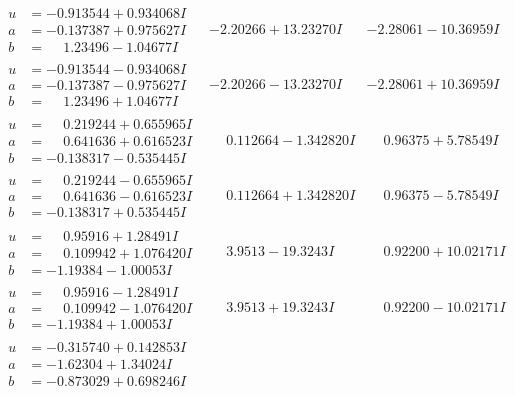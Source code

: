 \documentclass[1p]{elsarticle_modified}
\theoremstyle{definition}
\begin{document}
$$\begin{array}{c|c|c}
\begin{aligned}
u &= -0.913544 + 0.934068 I \\
a &= -0.137387 + 0.975627 I \\
b &= \phantom{-}1.23496 - 1.04677 I\end{aligned}
 & -2.20266 + 13.23270 I & -2.28061 - 10.36959 I \\ \hline\begin{aligned}
u &= -0.913544 - 0.934068 I \\
a &= -0.137387 - 0.975627 I \\
b &= \phantom{-}1.23496 + 1.04677 I\end{aligned}
 & -2.20266 - 13.23270 I & -2.28061 + 10.36959 I \\ \hline\begin{aligned}
u &= \phantom{-}0.219244 + 0.655965 I \\
a &= \phantom{-}0.641636 + 0.616523 I \\
b &= -0.138317 - 0.535445 I\end{aligned}
 & \phantom{-}0.112664 - 1.342820 I & \phantom{-}0.96375 + 5.78549 I \\ \hline\begin{aligned}
u &= \phantom{-}0.219244 - 0.655965 I \\
a &= \phantom{-}0.641636 - 0.616523 I \\
b &= -0.138317 + 0.535445 I\end{aligned}
 & \phantom{-}0.112664 + 1.342820 I & \phantom{-}0.96375 - 5.78549 I \\ \hline\begin{aligned}
u &= \phantom{-}0.95916 + 1.28491 I \\
a &= \phantom{-}0.109942 + 1.076420 I \\
b &= -1.19384 - 1.00053 I\end{aligned}
 & \phantom{-}3.9513 - 19.3243 I & \phantom{-}0.92200 + 10.02171 I \\ \hline\begin{aligned}
u &= \phantom{-}0.95916 - 1.28491 I \\
a &= \phantom{-}0.109942 - 1.076420 I \\
b &= -1.19384 + 1.00053 I\end{aligned}
 & \phantom{-}3.9513 + 19.3243 I & \phantom{-}0.92200 - 10.02171 I \\ \hline\begin{aligned}
u &= -0.315740 + 0.142853 I \\
a &= -1.62304 + 1.34024 I \\
b &= -0.873029 + 0.698246 I\end{aligned}

\end{array}$$
\end{document}
